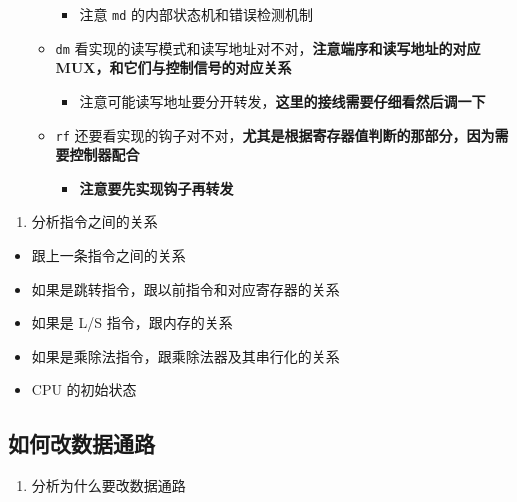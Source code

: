 \documentclass[12pt,AutoFakeBold,AutoFakeSlant]{article}
\providecommand{\tightlist}{%
  \setlength{\itemsep}{0pt}\setlength{\parskip}{0pt}}
\begin{document}
\begin{itemize}
\begin{itemize}
    \begin{itemize}
    \tightlist
    \item
      注意 \texttt{md} 的内部状态机和错误检测机制
    \end{itemize}
  \item
    \texttt{dm}
    看实现的读写模式和读写地址对不对，\textbf{注意端序和读写地址的对应
    MUX，和它们与控制信号的对应关系}

    \begin{itemize}
    \tightlist
    \item
      注意可能读写地址要分开转发，\textbf{这里的接线需要仔细看然后调一下}
    \end{itemize}
  \item
    \texttt{rf}
    还要看实现的钩子对不对，\textbf{尤其是根据寄存器值判断的那部分，因为需要控制器配合}

    \begin{itemize}
    \tightlist
    \item
      \textbf{注意要先实现钩子再转发}
    \end{itemize}
  \end{itemize}
\end{itemize}

\begin{enumerate}
\def\labelenumi{\arabic{enumi}.}
\setcounter{enumi}{2}
\tightlist
\item
  分析指令之间的关系
\end{enumerate}

\begin{itemize}
\tightlist
\item
  跟上一条指令之间的关系
\item
  如果是跳转指令，跟以前指令和对应寄存器的关系
\item
  如果是 L/S 指令，跟内存的关系
\item
  如果是乘除法指令，跟乘除法器及其串行化的关系
\item
  CPU 的初始状态
\end{itemize}

\hypertarget{ux5982ux4f55ux6539ux6570ux636eux901aux8def}{%
\subsection{如何改数据通路}\label{ux5982ux4f55ux6539ux6570ux636eux901aux8def}}

\begin{enumerate}
\def\labelenumi{\arabic{enumi}.}
\tightlist
\item
  分析为什么要改数据通路
\end{enumerate}
\end{document}
